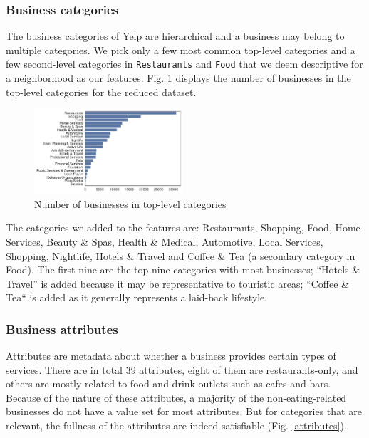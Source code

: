 \documentclass[compsoc]{IEEEtran}
\let\MYoriglatexcaption\caption
\renewcommand{\caption}[2][\relax]{\MYoriglatexcaption[#2]{#2}}
\begin{document}
\subsubsection{Business categories}

The business categories of Yelp are hierarchical and a business may belong to multiple categories. We pick only a few most common top-level categories and a few second-level categories in \texttt{Restaurants} and \texttt{Food} that we deem descriptive for a neighborhood as our features. Fig. \ref{categories} displays the number of businesses in the top-level categories for the reduced dataset.

\begin{figure}[h]
  \hspace{-.5em}
    \includegraphics[width=0.493\textwidth]{categories}
  \caption{Number of businesses in top-level categories}
  \label{categories}
\end{figure}

The categories we added to the features are: Restaurants, Shopping, Food, Home Services, Beauty \& Spas, Health \& Medical, Automotive, Local Services, Shopping, Nightlife, Hotels \& Travel and Coffee \& Tea (a secondary category in Food). The first nine are the top nine categories with most businesses; ``Hotels \& Travel'' is added because it may be representative to touristic areas; ``Coffee \& Tea`` is added as it generally represents a laid-back lifestyle.

\subsubsection{Business attributes}

Attributes are metadata about whether a business provides certain types of services. There are in total 39 attributes, eight of them are restaurants-only, and others are mostly related to food and drink outlets such as cafes and bars. Because of the nature of these attributes, a majority of the non-eating-related businesses do not have a value set for most attributes. But for categories that are relevant, the fullness of the attributes are indeed satisfiable (Fig. \ref{attributes}).
\end{document}
